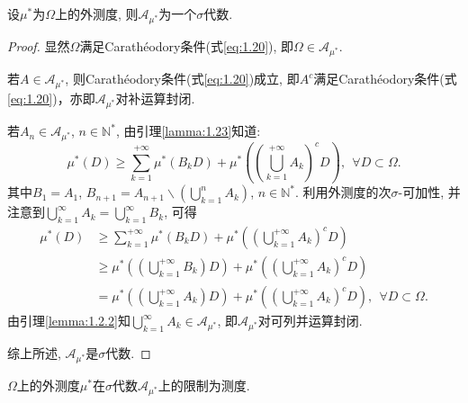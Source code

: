 \begin{theorem}
	设$\mu^*$为$\Omega$上的外测度, 则$\mathscr{A}_{\mu^*}$为一个$\sigma$代数.
\end{theorem}
\begin{proof}
	显然$\Omega$满足Carathéodory条件(式\ref{eq:1.20}), 即$\Omega\in\mathscr{A}_{\mu^*}$.
	
	若$A\in\mathscr{A}_{\mu^*}$, 则Carathéodory条件(式\ref{eq:1.20})成立, 即$A^c$满足Carathéodory条件(式\ref{eq:1.20})，亦即$\mathscr{A}_{\mu^*}$对补运算封闭.

	若$A_n\in\mathscr{A}_{\mu^*}$, $n\in\mathbb{N}^*$, 由引理\ref{lamma:1.23}知道:
	\begin{equation}
		\mu^*(D)\geqslant \sum_{k=1}^{+\infty}\mu^*(B_kD)+\mu^*\left( 
		\left( \bigcup_{k=1}^{+\infty}A_k \right)^c D	
		\right),~~\forall D\subset\Omega.
	\end{equation}
	其中$B_1 = A_1$, $B_{n+1} = A_{n+1}\backslash \left( \bigcup_{k=1}^n A_k \right)$, $n\in\mathbb{N}^*$.
	利用外测度的次$\sigma$-可加性, 并注意到$\bigcup_{k=1}^{\infty}A_k =\bigcup_{k=1}^{\infty}B_k $, 可得
	\begin{align}
		\mu^*(D)&\geqslant \sum_{k=1}^{+\infty}\mu^*(B_kD)+\mu^*\left( 
		\left( \bigcup_{k=1}^{+\infty}A_k \right)^c D	
		\right)\nonumber\\
		&\geqslant \mu^*\left(\left( \bigcup_{k=1}^{+\infty}B_k \right)D\right)+\mu^*\left( 
			\left( \bigcup_{k=1}^{+\infty}A_k \right)^c D	
			\right)\nonumber\\
		&=\mu^*\left(\left( \bigcup_{k=1}^{+\infty}A_k \right)D\right)+\mu^*\left( 
			\left( \bigcup_{k=1}^{+\infty}A_k \right)^c D	
			\right),~~\forall D\subset\Omega.
	\end{align}
	由引理\ref{lemma:1.2.2}知$\bigcup_{k=1}^{\infty}A_k\in\mathscr{A}_{\mu^*}$, 即$\mathscr{A}_{\mu^*}$对可列并运算封闭.

	综上所述, $\mathscr{A}_{\mu^*}$是$\sigma$代数.
\end{proof}

\begin{theorem}
	$\Omega$上的外测度$\mu^*$在$\sigma$代数$\mathscr{A}_{\mu^*}$上的限制为测度.
\end{theorem}

